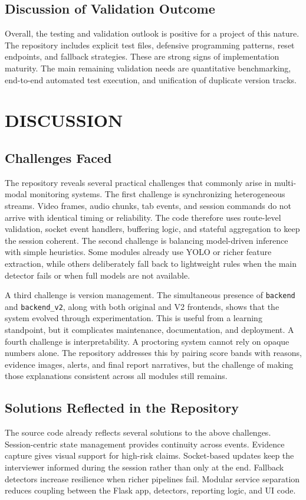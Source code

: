 \documentclass[12pt,a4paper]{extreport}
\begin{document}
\section{Discussion of Validation Outcome}
Overall, the testing and validation outlook is positive for a project of this nature. The repository includes explicit test files, defensive programming patterns, reset endpoints, and fallback strategies. These are strong signs of implementation maturity. The main remaining validation needs are quantitative benchmarking, end-to-end automated test execution, and unification of duplicate version tracks.

\chapter{DISCUSSION}
\section{Challenges Faced}
The repository reveals several practical challenges that commonly arise in multi-modal monitoring systems. The first challenge is synchronizing heterogeneous streams. Video frames, audio chunks, tab events, and session commands do not arrive with identical timing or reliability. The code therefore uses route-level validation, socket event handlers, buffering logic, and stateful aggregation to keep the session coherent. The second challenge is balancing model-driven inference with simple heuristics. Some modules already use YOLO or richer feature extraction, while others deliberately fall back to lightweight rules when the main detector fails or when full models are not available.

A third challenge is version management. The simultaneous presence of \texttt{backend} and \texttt{backend\_v2}, along with both original and V2 frontends, shows that the system evolved through experimentation. This is useful from a learning standpoint, but it complicates maintenance, documentation, and deployment. A fourth challenge is interpretability. A proctoring system cannot rely on opaque numbers alone. The repository addresses this by pairing score bands with reasons, evidence images, alerts, and final report narratives, but the challenge of making those explanations consistent across all modules still remains.

\section{Solutions Reflected in the Repository}
The source code already reflects several solutions to the above challenges. Session-centric state management provides continuity across events. Evidence capture gives visual support for high-risk claims. Socket-based updates keep the interviewer informed during the session rather than only at the end. Fallback detectors increase resilience when richer pipelines fail. Modular service separation reduces coupling between the Flask app, detectors, reporting logic, and UI code.
\end{document}
